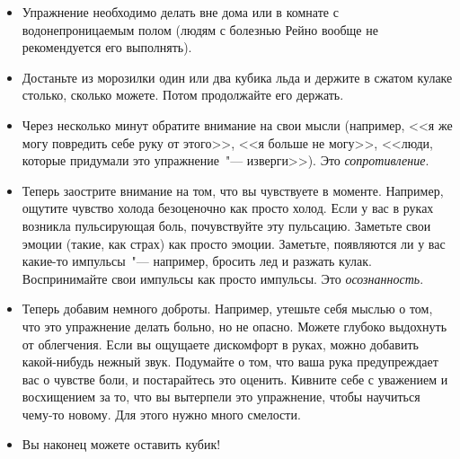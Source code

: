 \begin{itemize}
	\item Упражнение необходимо делать вне дома или в комнате с водонепроницаемым полом (людям с болезнью Рейно вообще не рекомендуется его выполнять).

	\item Достаньте из морозилки один или два кубика льда и держите в сжатом кулаке столько, сколько можете. Потом продолжайте его держать.
	
	\item Через несколько минут обратите внимание на свои мысли (например, <<я же могу повредить себе руку от этого>>, <<я больше не могу>>, <<люди, которые придумали это упражнение~"--- изверги>>). Это \emph{сопротивление}.  
	
	\item Теперь заострите внимание на том, что вы чувствуете в моменте. Например, ощутите чувство холода безоценочно как просто холод. Если у вас в руках возникла пульсирующая боль, почувствуйте эту пульсацию. Заметьте свои эмоции (такие, как страх) как просто эмоции. Заметьте, появляются ли у вас какие-то импульсы~"--- например, бросить лед и разжать кулак. Воспринимайте свои импульсы как просто импульсы. Это \emph{осознанность}. 
	
	\item Теперь добавим немного доброты. Например, утешьте себя мыслью о том, что это упражнение делать больно, но не опасно. Можете глубоко выдохнуть от облегчения. Если вы ощущаете дискомфорт в руках, можно добавить какой-нибудь нежный звук. Подумайте о том, что ваша рука предупреждает вас о чувстве боли, и постарайтесь это оценить. Кивните себе с уважением и восхищением за то, что вы вытерпели это упражнение, чтобы научиться чему-то новому. Для этого нужно много смелости.
	
	\item Вы наконец можете оставить кубик!
\end{itemize}

\newpage
{}

